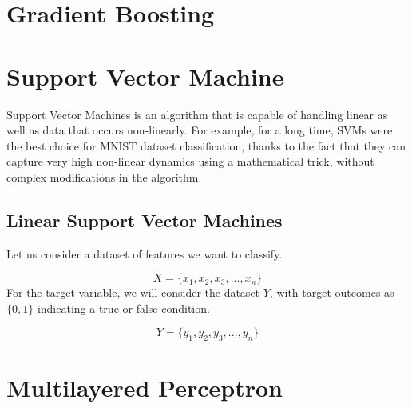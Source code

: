 \documentclass[12pt]{article}
\begin{document}
\newpage
\section{Gradient Boosting}

\newpage
\section{Support Vector Machine}
Support Vector Machines is an algorithm that is capable of handling 
linear as well as data that occurs non-linearly. For example, for a long time, SVMs were the best
choice for MNIST dataset classification, thanks to the fact that they can capture very high
non-linear dynamics using a mathematical trick, without complex modifications in the
algorithm.

\subsection{Linear Support Vector Machines}
Let us consider a dataset of features we want to classify.

$$
X = \lbrace x_{1}, x_{2}, x_{3}, ... , x_{n} \rbrace 
$$ For the target variable, we will consider the dataset $Y$, with target outcomes as $\lbrace0,1\rbrace$ indicating a true or false condition.

$$
Y = \lbrace y_{1}, y_{2}, y_{3}, ... , y_{n} \rbrace 
$$

\newpage
\section{Multilayered Perceptron}

\newpage
\end{document}
